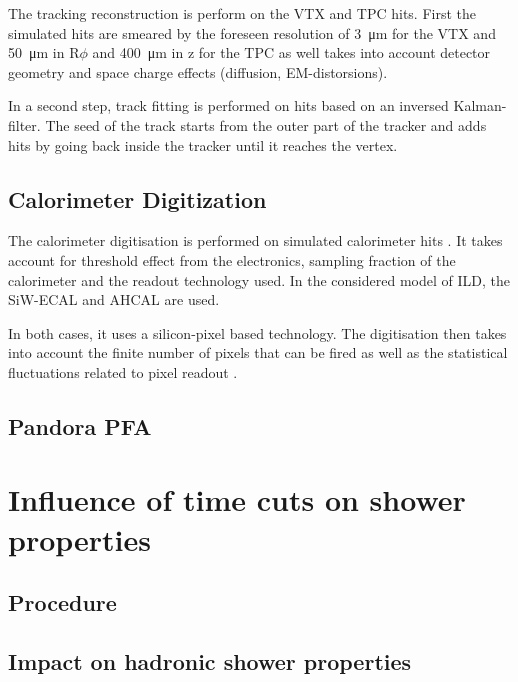 The tracking reconstruction is perform on the VTX and TPC hits. First the simulated hits are smeared by the foreseen resolution of \SI{3}{\micro\meter} for the VTX and \SI{50}{\micro\meter} in R$\phi$ and \SI{400}{\micro\meter} in z for the TPC as well takes into account detector geometry and space charge effects (diffusion, EM-distorsions).

In a second step, track fitting is performed on hits based on an inversed Kalman-filter. The seed of the track starts from the outer part of the tracker and adds hits by going back inside the tracker until it reaches the vertex.

\subsection{Calorimeter Digitization}

The calorimeter digitisation is performed on simulated calorimeter hits \cite{ILDCaloDigiPaper}. It takes account for threshold effect from the electronics, sampling fraction of the calorimeter and the readout technology used. In the considered model of ILD, the SiW-ECAL and AHCAL are used.

In both cases, it uses a silicon-pixel based technology. The digitisation then takes into account the finite number of pixels that can be fired as well as the statistical fluctuations related to pixel readout \cite{OskarThesis}.

\subsection{Pandora PFA}

\section{Influence of time cuts on shower properties}

\subsection{Procedure}
\subsection{Impact on hadronic shower properties}
